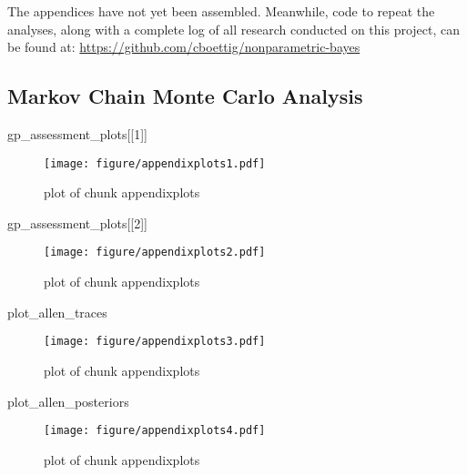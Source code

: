 \documentclass[author-year, review]{elsarticle} %
\makeatletter
\newenvironment{Shaded}{}{}
\newcommand{\DecValTok}[1]{\textcolor[rgb]{0.25,0.63,0.44}{{#1}}}
\newcommand{\NormalTok}[1]{{#1}}
\def\maxwidth{\ifdim\Gin@nat@width>\linewidth\linewidth
\else\Gin@nat@width\fi}
\let\Oldincludegraphics\includegraphics
\renewcommand{\includegraphics}[1]{\Oldincludegraphics[width=\maxwidth]{#1}}
\makeatother
\begin{document}
The appendices have not yet been assembled. Meanwhile, code to repeat
the analyses, along with a complete log of all research conducted on
this project, can be found at:
\href{https://github.com/cboettig/nonparametric-bayes/}{https://github.com/cboettig/nonparametric-bayes}

\subsection{Markov Chain Monte Carlo Analysis}

\begin{Shaded}
\begin{Highlighting}[]
\NormalTok{gp_assessment_plots[[}\DecValTok{1}\NormalTok{]]}
\end{Highlighting}
\end{Shaded}

\begin{figure}[htbp]
\centering
\texttt{[image: figure/appendixplots1.pdf]}
\caption{plot of chunk appendixplots}
\end{figure}

\begin{Shaded}
\begin{Highlighting}[]
\NormalTok{gp_assessment_plots[[}\DecValTok{2}\NormalTok{]]}
\end{Highlighting}
\end{Shaded}

\begin{figure}[htbp]
\centering
\texttt{[image: figure/appendixplots2.pdf]}
\caption{plot of chunk appendixplots}
\end{figure}

\begin{Shaded}
\begin{Highlighting}[]
\NormalTok{plot_allen_traces}
\end{Highlighting}
\end{Shaded}

\begin{figure}[htbp]
\centering
\texttt{[image: figure/appendixplots3.pdf]}
\caption{plot of chunk appendixplots}
\end{figure}

\begin{Shaded}
\begin{Highlighting}[]
\NormalTok{plot_allen_posteriors}
\end{Highlighting}
\end{Shaded}

\begin{figure}[htbp]
\centering
\texttt{[image: figure/appendixplots4.pdf]}
\caption{plot of chunk appendixplots}
\end{figure}
\end{document}
